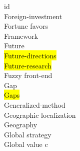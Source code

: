 \documentclass[a4paper]{article}
\begin{document}
\begin{multicols*}{2}
\begin{footnotesize}
id \\ Foreign-investment \\ Fortune favors \\ Framework \\ Future \\ \hl{Future-directions} \\ \hl{Future-research} \\ Fuzzy front-end \\ Gap \\ \hl{Gaps} \\ Generalized-method \\ Geographic localization \\ Geography \\ Global strategy \\ Global value c
\end{footnotesize}
\end{multicols*}
\end{document}
